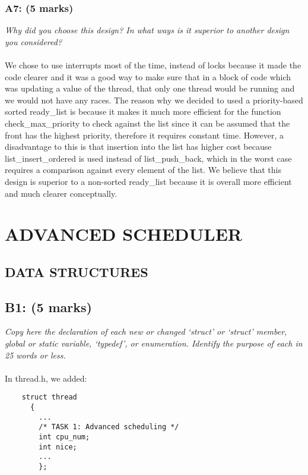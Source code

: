 \documentclass{article}
\begin{document}
\subsubsection*{A7: (5 marks) }
\textit{Why did you choose this design?  In what ways is it superior to another design you considered?}
\\ \\
We chose to use interrupts most of the time, instead of locks because it made the code clearer and it was a good way to make sure that in a block of code which was updating a value of the thread, that only one thread would be running and we would not have any races.
The reason why we decided to used a priority-based sorted ready\_list is because it makes it much more efficient for the function check\_max\_priority to check against the list since it can be assumed that the front has the highest priority, therefore it requires constant time. However, a disadvantage to this is that insertion into the list has higher cost because list\_insert\_ordered is used instead of list\_push\_back, which in the worst case requires a comparison against every element of the list. We believe that this design is superior to a non-sorted ready\_list because it is overall more efficient and much clearer conceptually.

\section{ADVANCED SCHEDULER}

\subsection{DATA STRUCTURES}

\subsection*{B1: (5 marks) }

\textit{Copy here the declaration of each new or changed ‘struct’ or ‘struct’ member, global or static variable, ‘typedef’, or enumeration. Identify the purpose of each in 25 words or less.}
\\\\
In thread.h, we added:
\begin{lstlisting}
    struct thread
      {
        ...
        /* TASK 1: Advanced scheduling */
        int cpu_num;
        int nice;
        ...
        };
\end{lstlisting}
\end{document}
